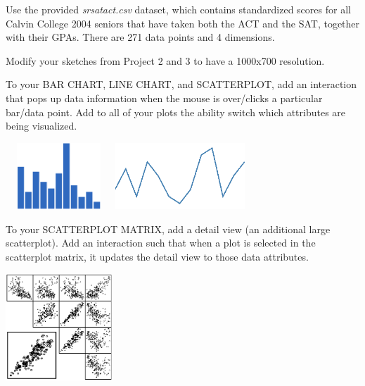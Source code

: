 \documentclass[a4paper,12pt]{article}
\begin{document}
\begin{itemize}

\item Use the provided \textit{srsatact.csv} dataset, which contains standardized scores for all Calvin College 2004 seniors that have taken both the ACT and the SAT, together with their GPAs. There are 271 data points and 4 dimensions. 

\item Modify your sketches from Project 2 and 3 to have a 1000x700 resolution. 


\item To your BAR CHART, LINE CHART, and SCATTERPLOT, add an interaction that pops up data information when the mouse is over/clicks a particular bar/data point. Add to all of your plots the ability switch which attributes are being visualized.

\begin{center}
\includegraphics[width=4cm, height=2.5cm]{../images/barchart.png} 
\hspace{15pt}
\includegraphics[height=2.5cm]{../images/linechart.png} 
\hspace{15pt}
\end{center}

\vspace{5pt}
\begin{minipage}{0.6\textwidth}
\item To your SCATTERPLOT MATRIX, add a detail view (an additional large scatterplot). Add an interaction such that when a plot is selected in the scatterplot matrix, it updates the detail view to those data attributes.
\end{minipage}\hspace{20pt}
\begin{minipage}{0.19\textwidth}
\includegraphics[width=4cm]{../images/splom+detail.png} 
\end{minipage}


\end{itemize}
\end{document}
